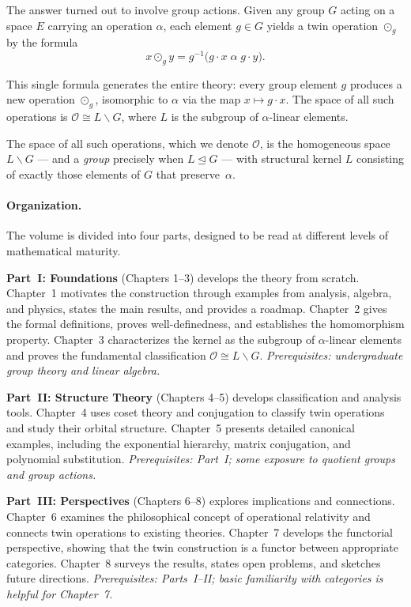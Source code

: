 \documentclass[11pt,a4paper,openany]{book}
\theoremstyle{plain}
\theoremstyle{definition}
\newcommand{\twing}[1]{\odot_{#1}}
\newcommand{\opspace}{\mathcal{O}}
\newcommand{\lingroup}{L}
\newcommand{\actspace}{E}
\newcommand{\groupG}{G}
\begin{document}
The answer turned out to involve group actions. Given any group $\groupG$ acting on a space $\actspace$ carrying an operation $\alpha$, each element $g \in \groupG$ yields a twin operation $\twing{g}$ by the formula
\[
x \twing{g} y = g^{-1}\big(g \cdot x \;\alpha\; g \cdot y\big).
\]

\begin{keyresult}
This single formula generates the entire theory: every group element $g$ produces a new operation $\twing{g}$, isomorphic to $\alpha$ via the map $x \mapsto g \cdot x$. The space of all such operations is $\opspace \cong \lingroup\backslash\groupG$, where $\lingroup$ is the subgroup of $\alpha$-linear elements.
\end{keyresult}

The space of all such operations, which we denote $\opspace$, is the homogeneous space $\lingroup\backslash\groupG$ --- and a \emph{group} precisely when $\lingroup\trianglelefteq\groupG$ --- with structural kernel $\lingroup$ consisting of exactly those elements of $\groupG$ that preserve~$\alpha$.

\paragraph{Organization.} The volume is divided into four parts, designed to be read at different levels of mathematical maturity.

\textbf{Part~I: Foundations} (Chapters 1--3) develops the theory from scratch. Chapter~1 motivates the construction through examples from analysis, algebra, and physics, states the main results, and provides a roadmap. Chapter~2 gives the formal definitions, proves well-definedness, and establishes the homomorphism property. Chapter~3 characterizes the kernel as the subgroup of $\alpha$-linear elements and proves the fundamental classification $\opspace \cong \lingroup\backslash\groupG$. \textit{Prerequisites: undergraduate group theory and linear algebra.}

\textbf{Part~II: Structure Theory} (Chapters 4--5) develops classification and analysis tools. Chapter~4 uses coset theory and conjugation to classify twin operations and study their orbital structure. Chapter~5 presents detailed canonical examples, including the exponential hierarchy, matrix conjugation, and polynomial substitution. \textit{Prerequisites: Part~I; some exposure to quotient groups and group actions.}

\textbf{Part~III: Perspectives} (Chapters 6--8) explores implications and connections. Chapter~6 examines the philosophical concept of operational relativity and connects twin operations to existing theories. Chapter~7 develops the functorial perspective, showing that the twin construction is a functor between appropriate categories. Chapter~8 surveys the results, states open problems, and sketches future directions. \textit{Prerequisites: Parts~I--II; basic familiarity with categories is helpful for Chapter~7.}
\end{document}
